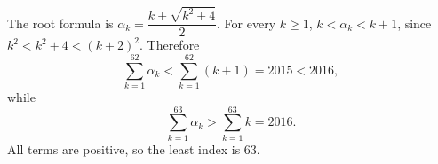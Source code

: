 The root formula is $\alpha_k=\dfrac{k+\sqrt{k^2+4}}{2}$. For every $k\ge1$, $k<\alpha_k<k+1$, since $k^2<k^2+4<(k+2)^2$. Therefore
\[
\sum_{k=1}^{62}\alpha_k<\sum_{k=1}^{62}(k+1)=2015<2016,
\]
while
\[
\sum_{k=1}^{63}\alpha_k>\sum_{k=1}^{63}k=2016.
\]
All terms are positive, so the least index is $\boxed{63}$.
